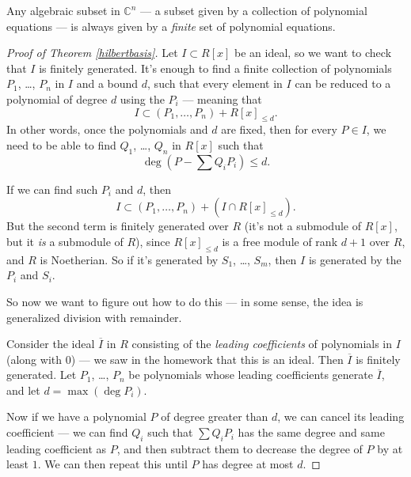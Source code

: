 \begin{corollary}
    Any algebraic subset in $\mathbb{C}^n$ --- a subset given by a collection of polynomial equations --- is always given by a \emph{finite} set of polynomial equations. 
\end{corollary} 

\begin{proof}[Proof of Theorem \ref{hilbertbasis}]
    Let $I \subset R[x]$ be an ideal, so we want to check that $I$ is finitely generated. It's enough to find a finite collection of polynomials $P_1$, \ldots, $P_n$ in $I$ and a bound $d$, such that every element in $I$ can be reduced to a polynomial of degree $d$ using the $P_i$ --- meaning that \[I \subset (P_1, \ldots, P_n) + R[x]_{\leq d}.\] In other words, once the polynomials and $d$ are fixed, then for every $P \in I$, we need to be able to find $Q_1$, \ldots, $Q_n$ in $R[x]$ such that \[\deg(P - \sum Q_iP_i) \leq d.\] 
    
    If we can find such $P_i$ and $d$, then \[I \subset (P_1, \ldots, P_n) + (I \cap R[x]_{\leq d}).\] But the second term is finitely generated over $R$ (it's not a submodule of $R[x]$, but it \emph{is} a submodule of $R$), since $R[x]_{\leq d}$ is a free module of rank $d + 1$ over $R$, and $R$ is Noetherian. So if it's generated by $S_1$, \ldots, $S_m$, then $I$ is generated by the $P_i$ and $S_i$. 

    So now we want to figure out how to do this --- in some sense, the idea is generalized division with remainder. 

    Consider the ideal $\overline{I}$ in $R$ consisting of the \emph{leading coefficients} of polynomials in $I$ (along with $0$) --- we saw in the homework that this is an ideal. Then $\overline{I}$ is finitely generated. Let $P_1$, \ldots, $P_n$ be polynomials whose leading coefficients generate $\overline{I}$, and let $d = \max(\deg P_i)$. 

    Now if we have a polynomial $P$ of degree greater than $d$, we can cancel its leading coefficient --- we can find $Q_i$ such that $\sum Q_iP_i$ has the same degree and same leading coefficient as $P$, and then subtract them to decrease the degree of $P$ by at least $1$. We can then repeat this until $P$ has degree at most $d$. 
\end{proof}


